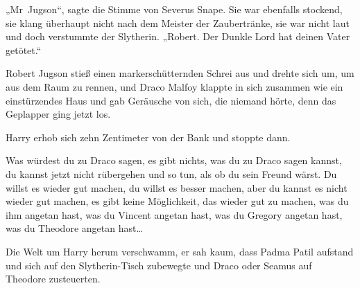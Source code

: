 „Mr~Jugson“, sagte die Stimme von Severus Snape.
Sie war ebenfalls stockend, sie klang überhaupt nicht nach dem Meister der Zaubertränke, sie war nicht laut und doch verstummte der Slytherin.
„Robert. Der Dunkle Lord hat deinen Vater getötet.“

Robert Jugson stieß einen markerschütternden Schrei aus und drehte sich um, um aus dem Raum zu rennen, und Draco Malfoy klappte in sich zusammen wie ein einstürzendes Haus und gab Geräusche von sich, die niemand hörte, denn das Geplapper ging jetzt los.

Harry erhob sich zehn Zentimeter von der Bank und stoppte dann.

Was würdest du zu Draco sagen, es gibt nichts, was du zu Draco sagen kannst, du kannst jetzt nicht rübergehen und so tun, als ob du sein Freund wärst.
Du willst es wieder gut machen, du willst es besser machen, aber du kannst es nicht wieder gut machen, es gibt keine Möglichkeit, das wieder gut zu machen, was du ihm angetan hast, was du Vincent angetan hast, was du Gregory angetan hast, was du Theodore angetan hast…

Die Welt um Harry herum verschwamm, er sah kaum, dass Padma Patil aufstand und sich auf den Slytherin-Tisch zubewegte und Draco oder Seamus auf Theodore zusteuerten.

